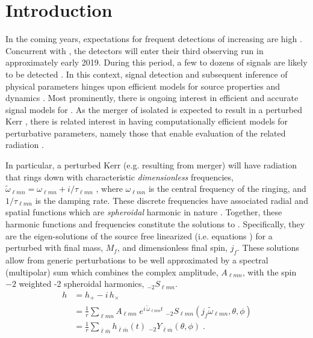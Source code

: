 \documentclass[twocolumn,aps,prd,floatfix,preprintnumbers,a4paper,nofootinbib,
superscriptaddress,10pt]{revtex4-1}
\newcommand{\cw}{\tilde{\omega}}
\def\jf{j_f}
\def\mf{M_f}
\def\lmn{_{\ell m n}}
\def\LM{_{\bar{\ell} \bar{m}}}
\begin{document}
\section{Introduction}
%
In the coming years, expectations for frequent \gw{} detections of increasing \snr{} are high \cite{TheLIGOScientific:2016pea,Abbott:2016nhf}.
%
Concurrent with \virgo{}, the \aligo{} detectors will enter their third observing run in approximately early 2019.
%
During this period, a few to dozens of \bbh{} signals are likely to be detected \cite{Abbott:2016nhf,Abbott2018OS}.
%
In this context, signal detection and subsequent inference of physical parameters hinges upon efficient models for source properties and dynamics \cite{Abbott:2016wiq}.
%
Most prominently, there is ongoing interest in efficient and accurate signal models for \bbh{} \imr{} \cite{Blackman:2017dfb, London:2017bcn, Hannam:2013oca}.
%
As the merger of isolated  is expected to result in a perturbed Kerr \bh{}, there is related interest in having computationally efficient models for perturbative parameters, namely those that enable evaluation of the related \rd{} radiation \cite{Berti:2005ys}.
%
\par In particular, a perturbed Kerr \bh{} (e.g. resulting from \bbh{} merger) will have \gw{} radiation that rings down with characteristic \textit{dimensionless} frequencies,
%
$%
	\cw\lmn = \omega\lmn + i/\tau\lmn
$%
, where $\omega\lmn$ is the central frequency of the ringing, and $1/\tau\lmn$ is the damping rate.
%
These discrete frequencies have associated radial and spatial functions which are \textit{spheroidal} harmonic in nature \cite{Leaver85}.
%
Together, these harmonic functions and frequencies constitute the \qnm{} solutions to \ee{}.
%
Specifically, they are the eigen-solutions of the source free linearized \ee{} (i.e.  equations \cite{PhysRevLett.29.1114}) for a perturbed \bh{} with final mass, $\mf$, and dimensionless final spin, $\jf$.
%
These solutions allow \grad{} from generic perturbations to be well approximated by a spectral (multipolar) sum which combines the complex \qnm{} amplitude, $A\lmn$, with the spin $-2$ weighted -2 spheroidal harmonics, $_{-2}S\lmn$.
%
\begin{align}
	\label{hrd}
	h &= h_{+} - i \, h_{\times}
	  \\ \nonumber
	  &= \frac{1}{r} \sum\lmn A\lmn \; e^{i\,\cw\lmn t} \; _{-2}S\lmn( \jf \cw\lmn,\theta,\phi)
		\\ \nonumber
		&= \frac{1}{r} \sum\LM h\LM(t) \; _{-2}Y\LM(\theta,\phi) \;  .
\end{align}
\end{document}
